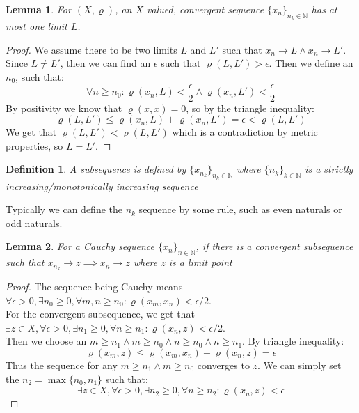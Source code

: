 \documentclass{article}
\newtheorem{lem}{Lemma}[section]
\newtheorem{defn}{Definition}[section]
\begin{document}
\medskip
\begin{lem}
For $(X, \varrho)$, an $X$ valued, convergent sequence $\{x_n\}_{n_k \in \mathbb{N}}$ has at most one limit $L$. 
\end{lem}
\begin{proof}
We assume there to be two limits $L$ and $L'$ such that $x_n \xrightarrow{} L \land x_n \xrightarrow{} L'$. Since $L \neq L'$, then we can find an $\epsilon$ such that $\varrho(L, L') > \epsilon$. Then we define an $n_0$, such that:
\begin{equation}
    \forall n \geqslant n_0: \varrho(x_n, L) < \frac{\epsilon}{2} \land \varrho(x_n, L') < \frac{\epsilon}{2}
\end{equation}
By positivity we know that $\varrho(x, x) = 0$, so by the triangle inequality:
\begin{equation*}
    \varrho(L, L') \leqslant \varrho(x_n, L) + \varrho(x_n, L')  = \epsilon < \varrho(L, L')
\end{equation*}
We get that $\varrho(L, L') < \varrho(L, L')$ which is a contradiction by metric properties, so $L = L'$.
\end{proof}

\medskip
\begin{defn}
A subsequence is defined by $\{x_{n_k}\}_{n_k \in \mathbb{N}}$ where $\{n_k\}_{k \in \mathbb{N}}$ is a strictly increasing/monotonically increasing sequence
\end{defn}
Typically we can define the $n_k$ sequence by some rule, such as even naturals or odd naturals.

\medskip
\begin{lem}
For a Cauchy sequence $\{x_n\}_{n \in \mathbb{N}}$, if there is a convergent subsequence such that $x_{n_k} \xrightarrow{} z \implies x_n \xrightarrow{} z$ where $z$ is a limit point
\end{lem}
\begin{proof}
The sequence being Cauchy means $\forall \epsilon > 0, \exists n_0 \geqslant 0, \forall m, n \geqslant n_0: \varrho(x_m, x_n) < \epsilon/2$.\\

For the convergent subsequence, we get that $\exists z \in X, \forall \epsilon > 0, \exists n_1 \geqslant 0, \forall n \geqslant n_1: \varrho(x_n, z) < \epsilon/2$.\\

Then we choose an $m \geqslant n_1 \land m \geqslant n_0 \land n \geqslant n_0 \land n \geqslant n_1$. By triangle inequality:
\begin{equation*}
    \varrho(x_m, z) \leqslant \varrho(x_m, x_n) + \varrho(x_n, z) = \epsilon
\end{equation*}
Thus the sequence for any $m \geqslant n_1 \land m \geqslant n_0$ converges to $z$. We can simply set the $n_2 = \max\{n_0, n_1\}$ such that:
\begin{equation*}
    \exists z \in X, \forall \epsilon > 0, \exists n_2 \geqslant 0, \forall n \geqslant n_2: \varrho(x_n, z) < \epsilon
\end{equation*}
\end{proof}
\end{document}
